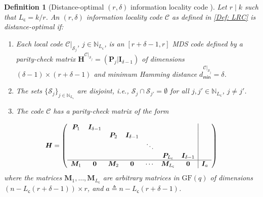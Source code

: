 \documentclass[twocolumn,conference]{IEEEtran}
\newcommand*{\Scale}[2][4]{\scalebox{#1}{\ensuremath{#2}}}%
\newtheorem{definition}{Definition}
\newcommand{\eqdef}{\triangleq}              %
\newcommand{\set}[1]{\mathcal{#1}}           %
\newcommand{\mat}[1]{\bm{#1}}                %
\newcommand{\GF}{\mathrm{GF}}                %
\newcommand{\Nat}[1]{\mathbb{N}_{#1}}        %
\begin{document}
\begin{definition}[Distance-optimal $(r,\delta)$ information locality code {\cite[Thm.~2.2]{Kam14}}]
\label{Def: OptLRCs}
Let $r\mid k$ such that $L_\mathsf{c}=k/r$. An $(r,\delta)$ information locality code $\mathcal C$ as defined in \cref{Def: LRC} is distance-optimal if:
\begin{enumerate}
\item Each local code $\mathcal C|_{\set{S}_j}$, $j\in\Nat{L_\mathsf{c}}$, is an $[r+\delta-1,r]$ MDS code defined by a parity-check matrix   $\mat{H}^{\mathcal C|_{\set{S}_j}}=(\bm P_j|\bm I_{\delta-1})$ of dimensions $(\delta-1)\times(r+\delta-1)$ and minimum Hamming distance $d_{\mathsf{min}}^{\mathcal C|_{\set{S}_j}}=\delta$. %
\item The sets $\{\mathcal S_j\}_{j\in\Nat{L_\mathsf{c}}}$ are disjoint, i.e., $\set{S}_j\cap\set{S}_{j'}=\emptyset$ for   all $j,j'\in\Nat{L_\mathsf{c}}$, $j\not=j'$.
\item The code $\mathcal C$ has a parity-check matrix of the form
\end{enumerate}
\begin{align}
 \Scale[0.95]{\label{Eq: H_opt_LRC}
  \mat{H}=\left(\begin{array}{ccccccc|c}
    \bm P_1 & \bm I_{\delta-1} &           &                  &       &             &                  & \\
            &                  & \bm P_2   & \bm I_{\delta-1} &       &             &                  & \\
            &                  &           &                  &\ddots &             &                  & \\
            &                  &           &                  &       & \bm P_{L_\mathsf{c}} & \bm I_{\delta-1} & \\
  \hline
  \mat{M}_1 & \bm 0            & \mat{M}_2 & \bm 0            &\cdots & \mat{M}_{L_\mathsf{c}} & \bm 0 & \bm I_a\\ 
  \end{array}\right)}
\end{align}
where the matrices $\bm M_1,\ldots, \bm M_{L_\mathsf{c}}$ are arbitrary matrices in $\GF(q)$ of dimensions $(n-L_\mathsf{c}(r+\delta-1))\times r$,  and $a\eqdef n-L_\mathsf{c}(r+\delta-1)$.
\end{definition}
\end{document}
